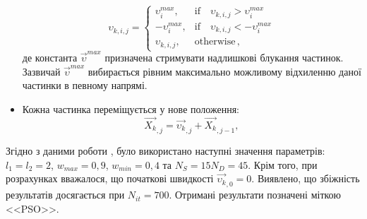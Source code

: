 \begin{itemize}
 \begin{equation}
 \label{PSO_Vmax}
 \upsilon_{k,i,j}=\left\{
 \begin{array}{ll}
 \upsilon_{i}^{max},& \text{if} \quad \upsilon_{k,i,j}>\upsilon_{i}^{max}\\
 -\upsilon_{i}^{max},& \text{if} \quad \upsilon_{k,i,j}<-\upsilon_{i}^{max}\\
 \upsilon_{k,i,j},& \text{otherwise}\,,
 \end{array}
 \right.
 \end{equation}
де
константа $ \overrightarrow{\upsilon}^{max}$  призначена стримувати надлишкові блукання частинок.
Зазвичай \cite{PSO_Ye} $ \overrightarrow{\upsilon}^{max}$ вибирається рівним максимально можливому відхиленню даної частинки в певному напрямі.
 \item Кожна частинка переміщується у нове положення:
 \begin{equation}
 \label{eqPSO_Final}
 \overrightarrow{X_{k}}_{,j}=\overrightarrow{\upsilon_{k}}_{,j}+\overrightarrow{X_{k}}_{,j-1},
 \end{equation}
\end{itemize}
Згідно з даними роботи \cite{PSO_Ye}, було використано наступні значення параметрів:
$l_1=l_2=2$, $w_{max}=0,9$, $w_{min}=0,4$ та $N_S=15N_D=45$.
Крім того, при розрахунках вважалося, що початкові швидкості $\overrightarrow{\upsilon_{k}}_{,0}=0$.
Виявлено, що збіжність результатів досягається при $N_{it}=700$.
Отримані результати позначені міткою <<PSO>>.


